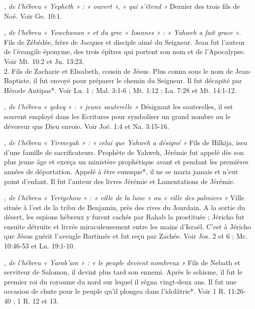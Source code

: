 \begin{multicols}{2}
{\textit{, de l'hébreu « Yepheth » : « ouvert », « qui s'étend »}\newline
Dernier des trois fils de Noé. Voir Ge. 10:1.

\textit{, de l'hébreu « Yowchanan » et du grec « Ioannes » : « Yahweh a fait grace »}. Fils de Zébédée, frère de Jacques et disciple aimé du Seigneur. Jean fut l'auteur de l'évangile éponyme, des trois épîtres qui portent son nom et de l'Apocalypse. Voir Mt. 10:2 et Jn. 13:23.
\\2. Fils de Zacharie et Elisabeth, cousin de Jésus. Plus connu sous le nom de Jean-Baptiste, il fut envoyé pour préparer le chemin du Seigneur. Il fut décapité par Hérode Antipas*. Voir Lu. 1 ; Mal. 3:1-6 ; Mt. 1:12 ; Lu. 7:28 et Mt. 14:1-12.

\textit{, de l'hébreu « yekeq » : « jeune sauterelle »}\newline
Désignant les sauterelles, il est souvent employé dans les Ecritures pour symboliser un grand nombre ou le dévoreur que Dieu envoie. Voir Joë. 1:4 et Na. 3:15-16.

\textit{, de l'hébreu « Yirmeyah » : « celui que Yahweh a désigné »}\newline
Fils de Hilkija, issu d'une famille de sacrificateurs. Prophète de Yahweh, Jérémie fut appelé dès son plus jeune âge et exerça un ministère prophétique avant et pendant les premières années de déportation. Appelé à être eunuque*, il ne se maria jamais et n'eut point d'enfant. Il fut l'auteur des livres Jérémie et Lamentations de Jérémie.

\textit{, de l'hébreu « Yeriychow » : « ville de la lune » ou « ville des palmiers »}\newline
Ville située à l'est de la tribu de Benjamin, près des rives du Jourdain. A la sortie du désert, les espions hébreux y furent cachés par Rahab la prostituée ; Jéricho fut ensuite détruite et livrée miraculeusement entre les mains d'Israël. C'est à Jéricho que Jésus guérit l'aveugle Bartimée et fut reçu par Zachée. Voir Jos. 2 et 6 ; Mc. 10:46-53 et Lu. 19:1-10.

\textit{, de l'hébreu « Yarob'am » : « le peuple devient nombreux »}\newline
Fils de Nebath et serviteur de Salomon, il devint plus tard son ennemi. Après le schisme, il fut le premier roi du royaume du nord sur lequel il régna vingt-deux ans. Il fut une occasion de chute pour le peuple qu'il plongea dans l'idolâtrie*. Voir 1 R. 11:26-40 ; 1 R. 12 et 13.

}
\end{multicols}
